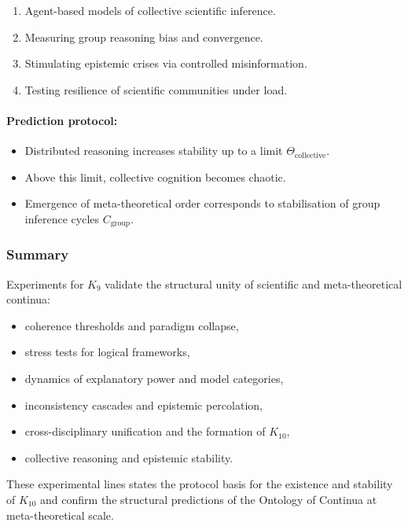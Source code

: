 \begin{enumerate}
    \item Agent-based models of collective scientific inference.
    \item Measuring group reasoning bias and convergence.
    \item Stimulating epistemic crises via controlled misinformation.
    \item Testing resilience of scientific communities under load.
\end{enumerate}

\paragraph{Prediction protocol:}

\begin{itemize}
    \item Distributed reasoning increases stability up to a limit
          $\Theta_{\mathrm{collective}}$.
    \item Above this limit, collective cognition becomes chaotic.
    \item Emergence of meta-theoretical order corresponds to stabilisation
          of group inference cycles $C_{\mathrm{group}}$.
\end{itemize}



\subsubsection{Summary}

Experiments for $K_9$ validate the structural unity of scientific and
meta-theoretical continua:

\begin{itemize}
    \item coherence thresholds and paradigm collapse,
    \item stress tests for logical frameworks,
    \item dynamics of explanatory power and model categories,
    \item inconsistency cascades and epistemic percolation,
    \item cross-disciplinary unification and the formation of $K_{10}$,
    \item collective reasoning and epistemic stability.
\end{itemize}

These experimental lines states the protocol basis for the
existence and stability of $K_{10}$ and confirm the structural
predictions of the Ontology of Continua at meta-theoretical scale.
